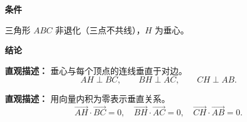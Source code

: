 \begin{statementbox}
	\textbf{\textcolor{CStatement}{条件}}
	\begin{description}[style=nextline, leftmargin=2.8em, labelsep=0.5em, itemsep=0.35em]
		\item[\textbf{\textcolor{CStatement}{条件 1（三角形非退化）：}}] 三角形 $ABC$ 非退化（三点不共线），$H$ 为垂心。
	\end{description}
	\textbf{\textcolor{CStatement}{结论}}
	\begin{description}[style=nextline, leftmargin=2.8em, labelsep=0.5em, itemsep=0.45em]
		\item[\textbf{\textcolor{CStatement}{结论一（垂线垂直）：}}]
			\textbf{\textcolor{CStatement}{直观描述：}}
			垂心与每个顶点的连线垂直于对边。
			\[
				AH\perp BC,
				\qquad
				BH\perp AC,
				\qquad
				CH\perp AB.
			\]
		\item[\textbf{\textcolor{CStatement}{推广结论（向量形式）：}}]
			\textbf{\textcolor{CStatement}{直观描述：}}
			用向量内积为零表示垂直关系。
			\[
				\overrightarrow{AH}\cdot\overrightarrow{BC}=0,\quad \overrightarrow{BH}\cdot\overrightarrow{AC}=0,\quad \overrightarrow{CH}\cdot\overrightarrow{AB}=0.
			\]
	\end{description}
\end{statementbox}
